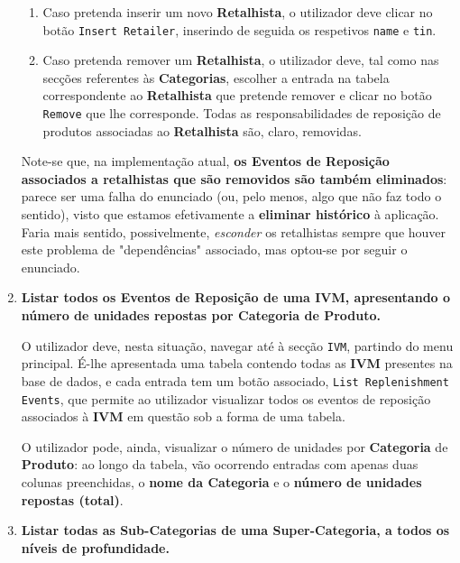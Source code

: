 \documentclass[12pt,a4paper]{article}
\begin{document}
\begin{enumerate}
        \begin{enumerate}
          \item Caso pretenda inserir um novo \textbf{Retalhista}, o utilizador
                deve clicar no botão \texttt{Insert Retailer}, inserindo de seguida os respetivos
                \texttt{name} e \texttt{tin}.

          \item Caso pretenda remover um \textbf{Retalhista}, o utilizador deve, tal
                como nas secções referentes às \textbf{Categorias}, escolher a entrada na
                tabela correspondente ao \textbf{Retalhista} que pretende remover e clicar
                no botão \texttt{Remove} que lhe corresponde. Todas as responsabilidades
                de reposição de produtos associadas ao \textbf{Retalhista} são, claro, removidas.
        \end{enumerate}

        Note-se que, na implementação atual, \textbf{os Eventos de Reposição associados
        a retalhistas que são removidos são também eliminados}: parece ser uma falha
        do enunciado (ou, pelo menos, algo que não faz todo o sentido), visto que
        estamos efetivamente a \textbf{eliminar histórico} à aplicação. Faria
        mais sentido, possivelmente, \textit{esconder} os retalhistas sempre que houver este problema
        de "dependências" associado, mas optou-se por seguir o enunciado.

  \item \textbf{Listar todos os Eventos de Reposição de uma IVM, apresentando
          o número de unidades repostas por Categoria de Produto.}

        O utilizador deve, nesta situação, navegar até à secção \texttt{IVM},
        partindo do menu principal. É-lhe apresentada uma tabela contendo todas as
        \textbf{IVM} presentes na base de dados, e cada entrada tem um botão
        associado, \texttt{List Replenishment Events}, que permite ao utilizador
        visualizar todos os eventos de reposição associados à \textbf{IVM} em questão
        sob a forma de uma tabela.

        O utilizador pode, ainda, visualizar o número
        de unidades por \textbf{Categoria} de \textbf{Produto}: ao longo da tabela,
        vão ocorrendo entradas com apenas duas colunas preenchidas, o \textbf{nome
          da Categoria} e o \textbf{número de unidades repostas (total)}.

  \item \textbf{Listar todas as Sub-Categorias de uma Super-Categoria, a todos
          os níveis de profundidade.}


\end{enumerate}
\end{document}
